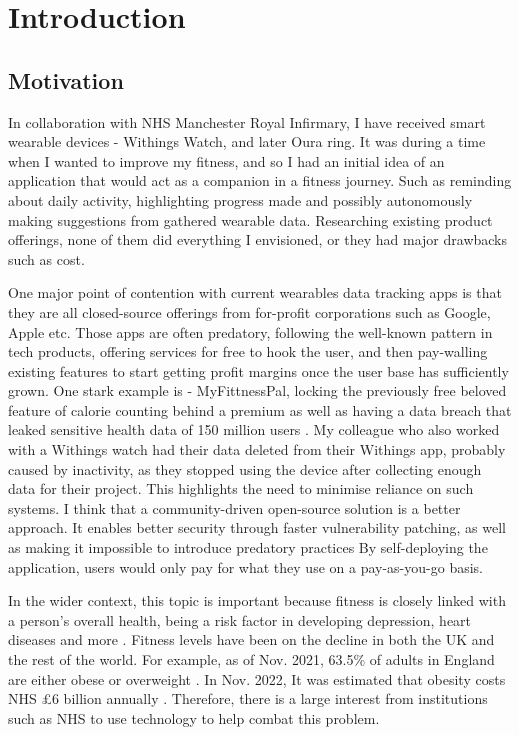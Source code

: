 \chapter{Introduction}
\label{cha:intro}

\section{Motivation}
\par
In collaboration with NHS Manchester Royal Infirmary, I have received smart wearable devices - Withings Watch,
and later Oura ring. It was during a time when I wanted to improve my fitness, and so I had an initial idea of an
application that would act as a companion in a fitness journey. Such as reminding about daily activity, highlighting progress made and
possibly autonomously making suggestions from gathered wearable data. Researching existing product offerings, none of them 
did everything I envisioned, or they had major drawbacks such as cost.
\par One major point of contention with current wearables data tracking apps is that they are all closed-source offerings
 from for-profit corporations such as Google, Apple etc.
 Those apps are often predatory, following the well-known pattern in tech products, offering
 services for free to hook the user, and then pay-walling existing features to start getting profit margins once the user base has sufficiently grown. 
 One stark example is - MyFittnessPal, locking the previously free beloved feature of 
 calorie counting behind a premium \cite{myfitnesspalPaywall} as well as having a data breach that leaked sensitive health data of 150 million users \cite{myFitnessPalDataBreach}.
 My colleague who also worked with a Withings watch had their data deleted from their Withings app, probably caused by inactivity, as they stopped using the device after collecting enough data for their project. 
 This highlights the need to minimise reliance on such systems. I think that a community-driven open-source solution is a better approach. 
 It enables better security through faster vulnerability patching, as well as making it impossible to introduce predatory practices \cite{openSourcePredatoryProtect} By self-deploying the application, users would only pay for what they use on a pay-as-you-go basis. 
\par
In the wider context, this topic is important because fitness is closely linked with a person's overall health, being a risk factor in developing depression, heart diseases and more \cite{nhsObesity}. 
Fitness levels have been on the decline in both the UK and the rest of the world.
For example, as of Nov. 2021, 63.5\% of adults in England are either obese or overweight \cite{ukObesity2023Survey}. 
In Nov. 2022, It was estimated that obesity costs NHS £6 billion annually \cite{nhsObesityCost}.
Therefore, there is a large interest from institutions such as NHS to use technology to help combat this problem.

